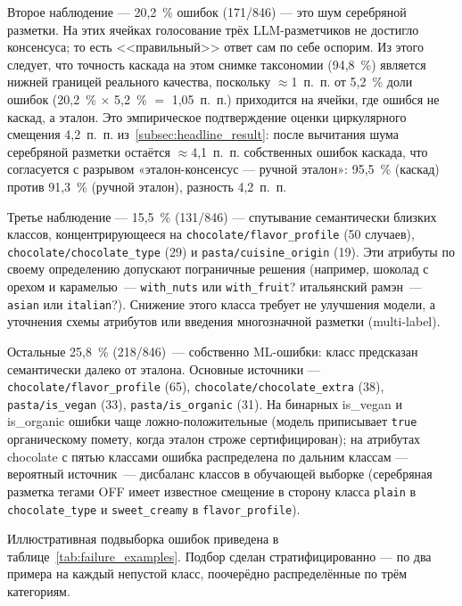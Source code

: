 Второе наблюдение --- 20,2~\% ошибок (171/846) --- это шум серебряной разметки. На этих ячейках голосование трёх LLM-разметчиков не достигло консенсуса; то есть <<правильный>> ответ сам по себе оспорим. Из этого следует, что точность каскада на этом снимке таксономии (94,8~\%) является нижней границей реального качества, поскольку $\approx$1~п.~п. от 5,2~\% доли ошибок (20,2~\% $\times$ 5,2~\% $=$ 1,05~п.~п.) приходится на ячейки, где ошибся не каскад, а эталон. Это эмпирическое подтверждение оценки циркулярного смещения 4,2~п.~п. из~\ref{subsec:headline_result}: после вычитания шума серебряной разметки остаётся $\approx$4,1~п.~п. собственных ошибок каскада, что согласуется с разрывом «эталон-консенсус — ручной эталон»: 95,5~\% (каскад) против 91,3~\% (ручной эталон), разность 4,2~п.~п.

Третье наблюдение --- 15,5~\% (131/846) --- спутывание семантически близких классов, концентрирующееся на \texttt{chocolate/flavor\_profile} (50 случаев), \texttt{chocolate/chocolate\_type} (29) и \texttt{pasta/cuisine\_origin} (19). Эти атрибуты по своему определению допускают пограничные решения (например, шоколад с орехом и карамелью~--- \texttt{with\_nuts} или \texttt{with\_fruit}? итальянский рамэн~--- \texttt{asian} или \texttt{italian}?). Снижение этого класса требует не улучшения модели, а уточнения схемы атрибутов или введения многозначной разметки (multi-label).

Остальные 25,8~\% (218/846)~--- собственно ML-ошибки: класс предсказан семантически далеко от эталона. Основные источники --- \texttt{chocolate/flavor\_profile} (65), \texttt{chocolate/chocolate\_extra} (38), \texttt{pasta/is\_vegan} (33), \texttt{pasta/is\_organic} (31). На бинарных is\_vegan и is\_organic ошибки чаще ложно-положительные (модель приписывает \texttt{true} органическому помету, когда эталон строже сертифицирован); на атрибутах chocolate с пятью классами ошибка распределена по дальним классам --- вероятный источник~--- дисбаланс классов в обучающей выборке (серебряная разметка тегами OFF имеет известное смещение в сторону класса \texttt{plain} в \texttt{chocolate\_type} и \texttt{sweet\_creamy} в \texttt{flavor\_profile}).

Иллюстративная подвыборка ошибок приведена в таблице~\ref{tab:failure_examples}. Подбор сделан стратифицированно --- по два примера на каждый непустой класс, поочерёдно распределённые по трём категориям.



